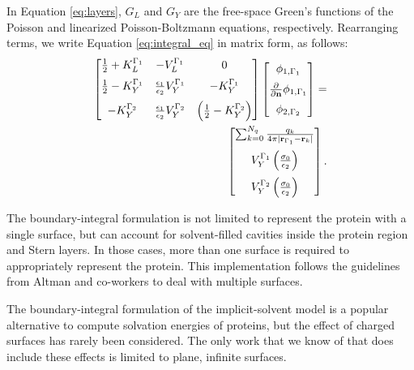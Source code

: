 \noindent In Equation \eqref{eq:layers}, $G_L$ and $G_Y$ are the free-space Green's functions of the Poisson and linearized Poisson-Boltzmann equations, respectively. 
Rearranging terms, we write Equation \eqref{eq:integral_eq} in matrix form, as follows:
%
 \begin{align} \label{eq:matrix_dphi}
 \left[
    \begin{matrix} %
       \frac{1}{2} + K_{L}^{\Gamma_1} & -V_{L}^{\Gamma_1} & 0 \vspace{0.2cm}\\
       \frac{1}{2} - K_{Y}^{\Gamma_1} &  \frac{\epsilon_1}{\epsilon_2} V_{Y}^{\Gamma_1} & -K_{Y}^{\Gamma_1} \vspace{0.2cm} \\
       - K_{Y}^{\Gamma_2} & \frac{\epsilon_1}{\epsilon_2} V_{Y}^{\Gamma_2} & \left(\frac{1}{2} - K_{Y}^{\Gamma_2}\right) \\
    \end{matrix}
    \right] \left[ 
    \begin{matrix} %
       \phi_{1,\Gamma_1} \vspace{0.2cm} \\
       \frac{\partial}{\partial \mathbf{n}} \phi_{1,\Gamma_1} \vspace{0.2cm}\\
       \phi_{2,\Gamma_2}\\
    \end{matrix} 
     \right] =   \nonumber \\
    \left[
    \begin{matrix} %
       \sum_{k=0}^{N_q} \frac{q_k}{4\pi|\mathbf{r}_{\Gamma_1} - \mathbf{r}_k|} \vspace{0.2cm} \\
        V_{Y}^{\Gamma_1} \left( \frac{\sigma_0}{\epsilon_2} \right) \vspace{0.2cm} \\
        V_{Y}^{\Gamma_2} \left( \frac{\sigma_0}{\epsilon_2} \right)
    \end{matrix}
    \right].
 \end{align}

The boundary-integral formulation is not limited to represent the protein with a single surface, but can account for solvent-filled cavities inside the protein region and Stern layers.\cite{CooperBardhanBarba2013} In those cases, more than one surface is required to appropriately represent the protein. 
This implementation follows the guidelines from Altman and co-workers to deal with multiple surfaces.

The boundary-integral formulation of the implicit-solvent model is a popular alternative to compute solvation energies of proteins,\cite{YoonLenhoff1990, Juffer1991a, LuETal2006, BajajETal2011, AltmanBardhanWhiteTidor09, GengKrasny2013, CooperBardhanBarba2013} but the effect of charged surfaces has rarely been considered. The only work that we know of that does include these effects is limited to plane, infinite surfaces.\cite{YoonLenhoff1992} 
